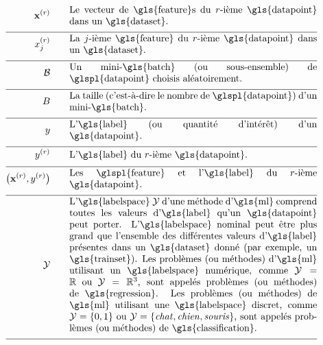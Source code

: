 \begin{align}
	\featurevec^{(\sampleidx)} \quad\quad &\parbox{.75\textwidth}{Le vecteur de \gls{feature}s du $\sampleidx$-ième \gls{datapoint} dans un \gls{dataset}. } \nonumber \\[2mm] \hline \nonumber\\[-5mm]
	\feature_{\featureidx}^{(\sampleidx)}\quad\quad &\parbox{.75\textwidth}{La $\featureidx$-ième \gls{feature} du $\sampleidx$-ième 
		\gls{datapoint} dans un \gls{dataset}.} \nonumber  \\[2mm] \hline \nonumber\\[-5mm]
	\batch \quad\quad &\parbox{.75\textwidth}{Un mini-\gls{batch} (ou sous-ensemble) de \glspl{datapoint} choisis aléatoirement.}\nonumber \\[2mm] \hline \nonumber\\[-5mm]
	\batchsize \quad\quad &\parbox{.75\textwidth}{La taille (c’est-à-dire le nombre de \glspl{datapoint}) d’un mini-\gls{batch}.}\nonumber \\[2mm] \hline \nonumber\\[-5mm]
	\truelabel \quad\quad &\parbox{.75\textwidth}{L'\gls{label} (ou quantité d’intérêt) d’un \gls{datapoint}.} \nonumber \\[2mm] \hline \nonumber\\[-5mm]
	\truelabel^{(\sampleidx)} \quad\quad &\parbox{.75\textwidth}{L'\gls{label} du $\sampleidx$-ième \gls{datapoint}.} \nonumber \\[2mm] \hline \nonumber\\[-5mm]
	\big(\featurevec^{(\sampleidx)},\truelabel^{(\sampleidx)}\big)  \quad\quad &\parbox{.75\textwidth}{Les \glspl{feature} et l'\gls{label} du $\sampleidx$-ième \gls{datapoint}.}\nonumber \\[2mm] \hline \nonumber\\[-5mm]
	\labelspace  \quad\quad & \parbox{.75\textwidth}{L’\gls{labelspace} $\labelspace$ d’une méthode d’\gls{ml} comprend toutes les valeurs d'\gls{label} qu’un \gls{datapoint} peut porter. L’\gls{labelspace} nominal peut être plus grand que l’ensemble des différentes valeurs d'\gls{label} présentes dans un \gls{dataset} donné (par exemple, un \gls{trainset}). Les problèmes (ou méthodes) d'\gls{ml} utilisant un \gls{labelspace} numérique, comme $\labelspace=\mathbb{R}$ ou $\labelspace=\mathbb{R}^{3}$, sont appelés problèmes (ou méthodes) de \gls{regression}. Les problèmes (ou méthodes) de \gls{ml} utilisant une \gls{labelspace} discret, comme $\labelspace=\{0,1\}$ ou $\labelspace=\{\mbox{\emph{chat}},\mbox{\emph{chien}},\mbox{\emph{souris}}\}$, sont appelés problèmes (ou méthodes) de \gls{classification}.}  \nonumber \\[2mm] \hline \nonumber\\[-5mm]

\end{align}
